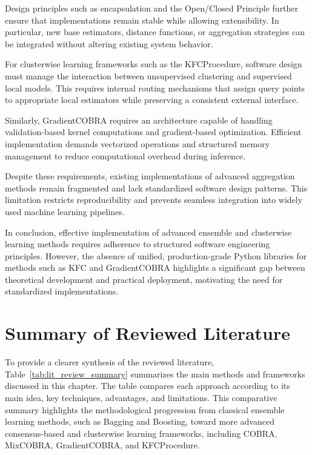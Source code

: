 Design principles such as encapsulation and the Open/Closed Principle further ensure that implementations remain stable while allowing extensibility. In particular, new base estimators, distance functions, or aggregation strategies can be integrated without altering existing system behavior.

For clusterwise learning frameworks such as the KFCProcedure, software design must manage the interaction between unsupervised clustering and supervised local models. This requires internal routing mechanisms that assign query points to appropriate local estimators while preserving a consistent external interface.

Similarly, GradientCOBRA requires an architecture capable of handling validation-based kernel computations and gradient-based optimization. Efficient implementation demands vectorized operations and structured memory management to reduce computational overhead during inference.

Despite these requirements, existing implementations of advanced aggregation methods remain fragmented and lack standardized software design patterns. This limitation restricts reproducibility and prevents seamless integration into widely used machine learning pipelines.

In conclusion, effective implementation of advanced ensemble and clusterwise learning methods requires adherence to structured software engineering principles. However, the absence of unified, production-grade Python libraries for methods such as KFC and GradientCOBRA highlights a significant gap between theoretical development and practical deployment, motivating the need for standardized implementations.

\section{Summary of Reviewed Literature}

\hs To provide a clearer synthesis of the reviewed literature, Table~\ref{tab:lit_review_summary} summarizes the main methods and frameworks discussed in this chapter. The table compares each approach according to its main idea, key techniques, advantages, and limitations. This comparative summary highlights the methodological progression from classical ensemble learning methods, such as Bagging and Boosting, toward more advanced consensus-based and clusterwise learning frameworks, including COBRA, MixCOBRA, GradientCOBRA, and KFCProcedure.
    
